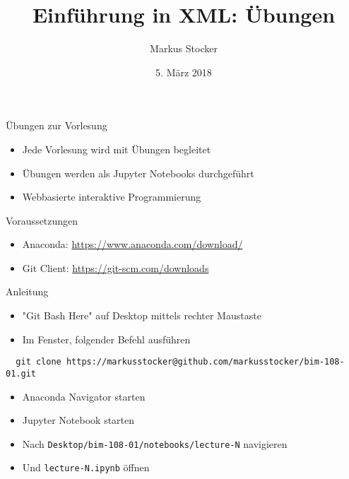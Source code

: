 \documentclass{beamer}
\title{Einführung in XML: Übungen}
\author{Markus Stocker}
\date{5. März 2018}
\begin{document}
\maketitle

\begin{frame}{Übungen zur Vorlesung}
  
  \begin{itemize}
  	\item Jede Vorlesung wird mit Übungen begleitet
  	\item Übungen werden als Jupyter Notebooks durchgeführt
  	\item Webbasierte interaktive Programmierung
  \end{itemize}
  
\end{frame}

\begin{frame}{Voraussetzungen}
	
	\begin{itemize}
		\item Anaconda: \url{https://www.anaconda.com/download/}
		\item Git Client: \url{https://git-scm.com/downloads}
	\end{itemize}
	
\end{frame}

\begin{frame}[fragile]{Anleitung}
	
	\begin{itemize}
		\item "Git Bash Here" auf Desktop mittels rechter Maustaste
		\item Im Fenster, folgender Befehl ausführen
	\end{itemize}

    \scriptsize
	\begin{verbatim}
  git clone https://markusstocker@github.com/markusstocker/bim-108-01.git
	\end{verbatim}
	
	\normalsize
	\begin{itemize}
		\item Anaconda Navigator starten
		\item Jupyter Notebook starten
		\item Nach \texttt{Desktop/bim-108-01/notebooks/lecture-N} navigieren
		\item Und \texttt{lecture-N.ipynb} öffnen
	\end{itemize}
	
\end{frame}
\end{document}
